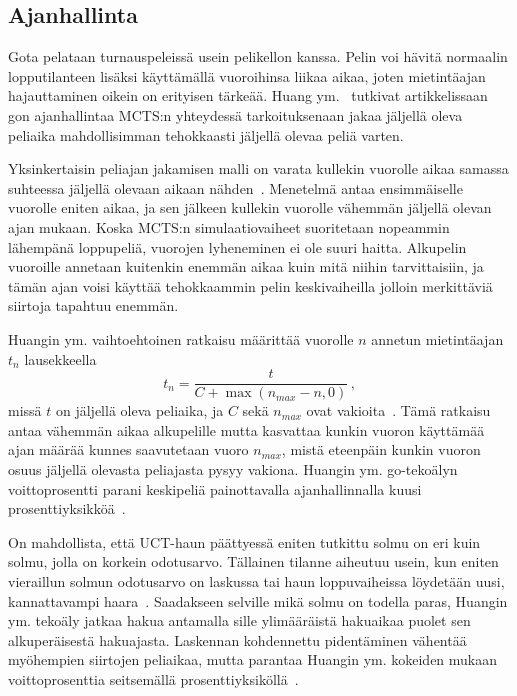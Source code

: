 \documentclass[12pt,finnish]{tktltiki2}
\theoremstyle{definition}
\theoremstyle{remark}
\begin{document}
\subsection{Ajanhallinta}

Gota pelataan turnauspeleissä usein pelikellon kanssa. Pelin voi hävitä normaalin lopputilanteen lisäksi käyttämällä vuoroihinsa liikaa aikaa, joten mietintäajan hajauttaminen oikein on erityisen tärkeää. Huang ym.~\cite{huang} tutkivat artikkelissaan gon ajanhallintaa MCTS:n yhteydessä tarkoituksenaan jakaa jäljellä oleva peliaika mahdollisimman tehokkaasti jäljellä olevaa peliä varten.

Yksinkertaisin peliajan jakamisen malli on varata kullekin vuorolle aikaa samassa suhteessa jäljellä olevaan aikaan nähden~\cite{huang}. Menetelmä antaa ensimmäiselle vuorolle eniten aikaa, ja sen jälkeen kullekin vuorolle vähemmän jäljellä olevan ajan mukaan. Koska MCTS:n simulaatiovaiheet suoritetaan nopeammin lähempänä loppupeliä, vuorojen lyheneminen ei ole suuri haitta. Alkupelin vuoroille annetaan kuitenkin enemmän aikaa kuin mitä niihin tarvittaisiin, ja tämän ajan voisi käyttää tehokkaammin pelin keskivaiheilla jolloin merkittäviä siirtoja tapahtuu enemmän.

Huangin ym. vaihtoehtoinen ratkaisu määrittää vuorolle $n$ annetun mietintäajan $t_n$ lausekkeella
\begin{equation}
t_n = \frac{t}{C + \max(n_{max} - n, 0)}\,,
\end{equation}
missä $t$ on jäljellä oleva peliaika, ja $C$ sekä $n_{max}$ ovat vakioita~\cite{huang}. Tämä ratkaisu antaa vähemmän aikaa alkupelille mutta kasvattaa kunkin vuoron käyttämää ajan määrää kunnes saavutetaan vuoro $n_{max}$, mistä eteenpäin kunkin vuoron osuus jäljellä olevasta peliajasta pysyy vakiona. Huangin ym. go-tekoälyn voittoprosentti parani keskipeliä painottavalla ajanhallinnalla kuusi prosenttiyksikköä~\cite{huang}.

On mahdollista, että UCT-haun päättyessä eniten tutkittu solmu on eri kuin solmu, jolla on korkein odotusarvo. Tällainen tilanne aiheutuu usein, kun eniten vieraillun solmun odotusarvo on laskussa tai haun loppuvaiheissa löydetään uusi, kannattavampi haara~\cite{huang}. Saadakseen selville mikä solmu on todella paras, Huangin ym. tekoäly jatkaa hakua antamalla sille ylimääräistä hakuaikaa puolet sen alkuperäisestä hakuajasta. Laskennan kohdennettu pidentäminen vähentää myöhempien siirtojen peliaikaa, mutta parantaa Huangin ym. kokeiden mukaan voittoprosenttia seitsemällä prosenttiyksiköllä~\cite{huang}.
\end{document}
